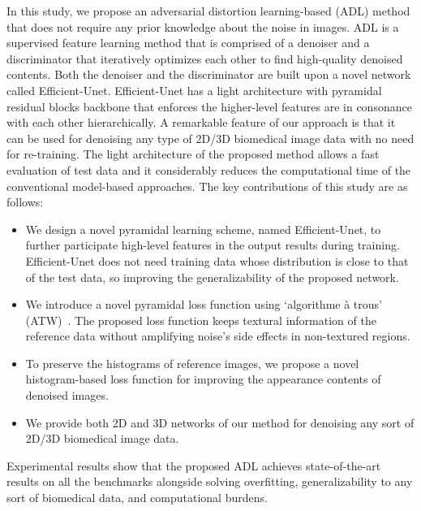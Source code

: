 \documentclass[journal,twoside,web]{ieeecolor}
\begin{document}
In this study, we propose an adversarial distortion learning-based (ADL) method that does not require any prior knowledge about the noise in images.
ADL is a supervised feature learning method that is comprised of a denoiser and a discriminator that iteratively optimizes each other to find high-quality denoised contents. Both the denoiser and the discriminator are built upon a novel network called Efficient-Unet. Efficient-Unet has a light architecture with pyramidal residual blocks backbone that enforces the higher-level features are in consonance with each other hierarchically. 
A remarkable feature of our approach is that it can be used for denoising any type of 2D/3D biomedical image data with no need for re-training. The light architecture of the proposed method allows a fast evaluation of test data and it considerably reduces the computational time of the conventional model-based approaches. 
The key contributions of this study are as follows:
\begin{itemize}
    \item We design a novel pyramidal learning scheme, named Efficient-Unet, to further participate high-level features in the output results during training. Efficient-Unet does not need training data whose distribution is close to that of the test data, so improving the generalizability of the proposed network.
    \item We introduce a novel pyramidal loss function using `algorithme à trous' (ATW)~\cite{starck2007undecimated}. The proposed loss function keeps textural information of the reference data without amplifying noise's side effects in non-textured regions. 
    \item To preserve the histograms of reference images, we propose a novel histogram-based loss function for improving the appearance contents of denoised images.
    \item We provide both 2D and 3D networks of our method for denoising any sort of 2D/3D biomedical image data.
\end{itemize}
Experimental results show that the proposed ADL achieves state-of-the-art results on all the benchmarks alongside solving overfitting, generalizability to any sort of biomedical data, and computational burdens.
\end{document}
